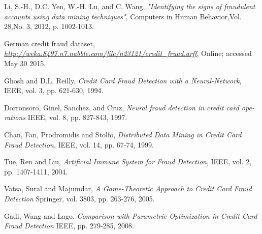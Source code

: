 \documentclass[journal]{IEEEtran}
\newcommand{\نیمفاصله}{\halfspace}
\renewcommand{\ }{\halfspace}
\newcommand{\وکا}{\lr{WEKA} }
\newcommand{\ار}{\lr{R} }
\renewcommand{\|}[1][.3em]{\hspace{#1}|\hspace{#1}}
\renewcommand{\,}[1][.3em]{,\hspace{#1}}
\begin{document}
\newpage
\begin{thebibliography}{1}\small
\begin{latin}
Li, S.-H., D.C. Yen, W.-H. Lu, and C. Wang, \emph{"Identifying the signs of fraudulent accounts using data mining techniques"}, Computers in Human Behavior,Vol. 28,No. 3, 2012, p. 1002-1013.

German credit fraud dataset, \emph{\url{http://weka.8497.n7.nabble.com/file/n23121/credit_fruad.arff}}, Online; accessed May 30 2015.

Ghosh and D.L. Reilly, \emph{Credit Card Fraud Detection with a Neural-Network}, IEEE, vol. 3, pp. 621-630, 1994.

Dorronsoro, Ginel, Sanchez, and Cruz, \emph{Neural fraud detection in credit card operations} IEEE, vol. 8, pp. 827-843, 1997.

Chan, Fan, Prodromidis and Stolfo, \emph{Distributed Data Mining in Credit Card Fraud Detection}, IEEE, vol. 14, pp. 67-74, 1999.

Tue, Ren and Liu, \emph{Artificial Immune System for Fraud Detection}, IEEE, vol. 2, pp. 1407-1411, 2004.

Vatsa, Sural and Majumdar, \emph{A Game-Theoretic Approach to Credit Card Fraud Detection} Springer, vol. 3803, pp. 263-276, 2005.

Gadi, Wang and Lago, \emph{Comparison with Parametric Optimization in Credit Card Fraud Detection} IEEE, pp. 279-285, 2008.

\end{latin}
\end{thebibliography}
\end{document}
